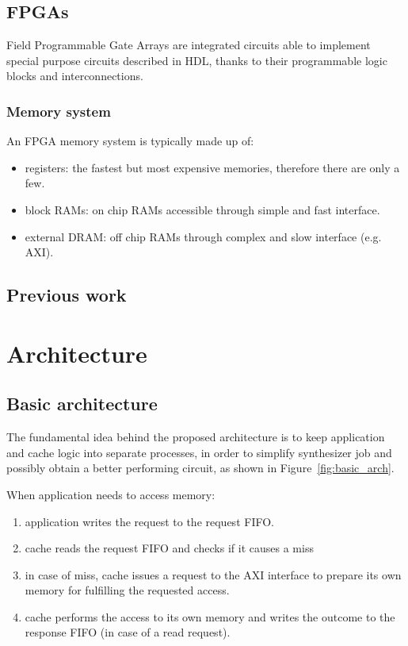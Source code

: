 \documentclass[11pt,a4paper]{memoir}
\begin{document}
\section{FPGAs}
Field Programmable Gate Arrays are integrated circuits able to implement special
purpose circuits described in HDL, thanks to their programmable logic blocks and
interconnections.
\subsection{Memory system}
An FPGA memory system is typically made up of:
\begin{itemize}
	\item registers: the fastest but most expensive memories, therefore
		there are only a few.
	\item block RAMs: on chip RAMs accessible through simple and fast
		interface.
	\item external DRAM: off chip RAMs through complex and slow interface
		(e.g. AXI).
\end{itemize}

\section{Previous work}

\chapter{Architecture}
\section{Basic architecture}
The fundamental idea behind the proposed architecture is to keep application and
cache logic into separate processes, in order to simplify synthesizer job and
possibly obtain a better performing circuit, as shown in Figure~\ref{fig:basic_arch}.

When application needs to access memory:
\begin{enumerate}
	\item application writes the request to the request FIFO.
	\item cache reads the request FIFO and checks if it causes a miss
	\item in case of miss, cache issues a request to the AXI interface to
		prepare its own memory for fulfilling the requested access.
	\item cache performs the access to its own memory and writes the outcome
		to the response FIFO (in case of a read request).
\end{enumerate}
\end{document}
